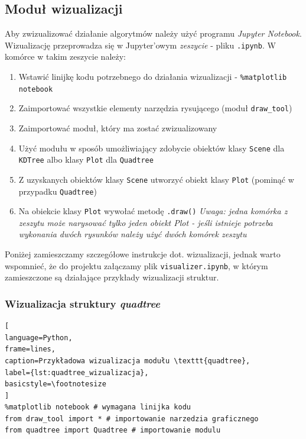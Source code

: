 \documentclass{article}
\begin{document}
\subsection{Moduł wizualizacji}

Aby zwizualizować działanie algorytmów należy użyć programu \textit{Jupyter Notebook}. Wizualizację przeprowadza się w Jupyter'owym \textit{zeszycie} - pliku \texttt{.ipynb}. W komórce w takim zeszycie należy:
\begin{enumerate}
    \item Wstawić linijkę kodu potrzebnego do działania wizualizacji - \texttt{\%matplotlib notebook}
    \item Zaimportować wszystkie elementy narzędzia rysującego (moduł \texttt{draw\_tool})
    \item Zaimportować moduł, który ma zostać zwizualizowany
    \item Użyć modułu w sposób umożliwiający zdobycie obiektów klasy \texttt{Scene} dla \texttt{KDTree} albo klasy \texttt{Plot} dla \texttt{Quadtree}
    \item Z uzyskanych obiektów klasy \texttt{Scene} utworzyć obiekt klasy \texttt{Plot} (pominąć w przypadku \texttt{Quadtree})
    \item Na obiekcie klasy \texttt{Plot} wywołać metodę \texttt{.draw()} \textit{Uwaga: jedna komórka z zeszytu może narysować tylko jeden obiekt Plot - jeśli istnieje potrzeba wykonania dwóch rysunków należy użyć dwóch komórek zeszytu}
\end{enumerate}

Poniżej zamieszczamy szczegółowe instrukcje dot. wizualizacji, jednak warto wspomnieć, że do projektu załączamy plik \texttt{visualizer.ipynb}, w którym zamieszczone są działające przykłady wizualizacji struktur.

\subsubsection{Wizualizacja struktury \textit{quadtree}}

\begin{lstlisting}[
language=Python,
frame=lines,
caption=Przykładowa wizualizacja modułu \texttt{quadtree},
label={lst:quadtree_wizualizacja},
basicstyle=\footnotesize
]
%matplotlib notebook # wymagana linijka kodu
from draw_tool import * # importowanie narzedzia graficznego
from quadtree import Quadtree # importowanie modulu

\end{lstlisting}
\end{document}
